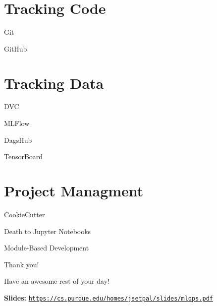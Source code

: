 \documentclass{beamer}
\begin{document}
\section{Tracking Code}

\begin{frame}{Git}
\end{frame}

\begin{frame}{GitHub}
\end{frame}

\section{Tracking Data}

\begin{frame}{DVC}
\end{frame}

\begin{frame}{MLFlow}
\end{frame}

\begin{frame}{DagsHub}
\end{frame}

\begin{frame}{TensorBoard}
\end{frame}

\section{Project Managment}

\begin{frame}{CookieCutter}
\end{frame}

\begin{frame}{Death to Jupyter Notebooks}
\end{frame}

\begin{frame}{Module-Based Development}
\end{frame}

\begin{frame}{Thank you!}
	\begin{center}
		Have an awesome rest of your day!
	\end{center}
	\begin{center}
		\textbf{Slides:} \texttt{\url{https://cs.purdue.edu/homes/jsetpal/slides/mlops.pdf}}
	\end{center}
\end{frame}
\end{document}
